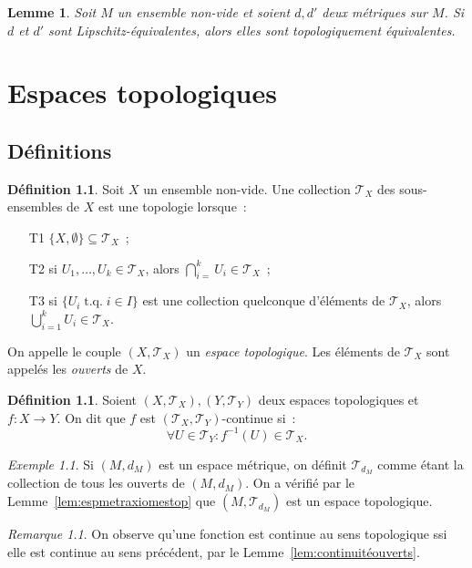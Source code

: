 \documentclass{report}
\newtheorem{lem}[thm]{Lemme}
\theoremstyle{definition}
\newtheorem{déf}[thm]{Définition}
\theoremstyle{remark}
\newtheorem*{rmq}{Remarque}
\newtheorem{ex}{Exemple}[chapter]
\DeclareMathOperator{\tq}{\text{ t.q. }}
\renewcommand{\top}{\mathcal T}
\begin{document}
		\begin{lem} Soit $M$ un ensemble non-vide et soient $d, d'$ deux métriques sur $M$. Si $d$ et $d'$ sont Lipschitz-équivalentes, alors elles sont topologiquement
		équivalentes.
		\end{lem}

\chapter{Espaces topologiques}
	\section{Définitions}
		\begin{déf} Soit $X$ un ensemble non-vide. Une collection $\top_X$ des sous-ensembles de $X$ est une topologie lorsque~:
		\begin{itemize}
			\item[T1] $\{X, \emptyset\} \subseteq \top_X$~;
			\item[T2] si $U_1, \ldots, U_k \in \top_X$, alors $\bigcap_{i=}^kU_i \in \top_X$~;
			\item[T3] si $\{U_i \tq i \in I\}$ est une collection quelconque d'éléments de $\top_X$, alors $\bigcup_{i=1}^kU_i \in \top_X$.
		\end{itemize}

		On appelle le couple $(X, \top_X)$ un \textit{espace topologique}. Les éléments de $\top_X$ sont appelés les \textit{ouverts} de $X$.
		\end{déf}

		\begin{déf} Soient $(X, \top_X), (Y, \top_Y)$ deux espaces topologiques et $f : X \to Y$. On dit que $f$ est $(\top_X, \top_Y)$-continue si~:
		\[\forall U \in \top_Y : f^{-1}(U) \in \top_X.\]
		\end{déf}

		\begin{ex} Si $(M, d_M)$ est un espace métrique, on définit $\top_{d_M}$ comme étant la collection de tous les ouverts de $(M, d_M)$. On a vérifié par
		le Lemme~\ref{lem:espmetraxiomestop} que $(M, \top_{d_M})$ est un espace topologique.
		\end{ex}

		\begin{rmq} On observe qu'une fonction est continue au sens topologique ssi elle est continue au sens précédent, par le Lemme~\ref{lem:continuitéouverts}.
		\end{rmq}
\end{document}
